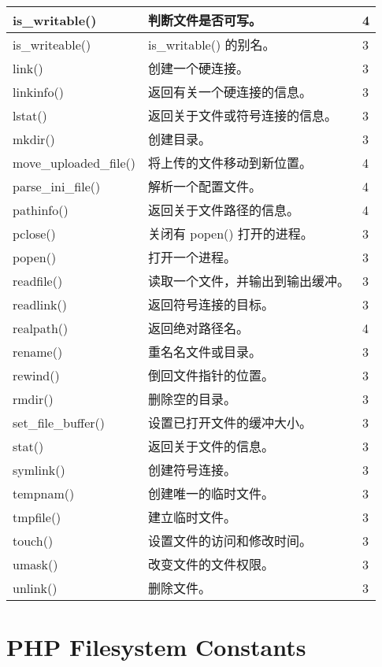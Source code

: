 \begin{longtable}{|m{120pt}|m{250pt}|m{20pt}|}
\hline
is\_writable()	&判断文件是否可写。	&4\\
\hline
is\_writeable()	&is\_writable() 的别名。	&3\\
\hline
link()	&创建一个硬连接。	&3\\
\hline
linkinfo()	&返回有关一个硬连接的信息。	&3\\
\hline
lstat()	&返回关于文件或符号连接的信息。	&3\\
\hline
mkdir()	&创建目录。	&3\\
\hline
move\_uploaded\_file()	&将上传的文件移动到新位置。	&4\\
\hline
parse\_ini\_file()	&解析一个配置文件。	&4\\
\hline
pathinfo()	&返回关于文件路径的信息。	&4\\
\hline
pclose()	&关闭有 popen() 打开的进程。	&3\\
\hline
popen()	&打开一个进程。	&3\\
\hline
readfile()	&读取一个文件，并输出到输出缓冲。	&3\\
\hline
readlink()	&返回符号连接的目标。	&3\\
\hline
realpath()	&返回绝对路径名。	&4\\
\hline
rename()	&重名名文件或目录。	&3\\
\hline
rewind()	&倒回文件指针的位置。	&3\\
\hline
rmdir()	&删除空的目录。	&3\\
\hline
set\_file\_buffer()	&设置已打开文件的缓冲大小。	&3\\
\hline
stat()	&返回关于文件的信息。	&3\\
\hline
symlink()	&创建符号连接。	&3\\
\hline
tempnam()	&创建唯一的临时文件。&	3\\
\hline
tmpfile()	&建立临时文件。	&3\\
\hline
touch()	&设置文件的访问和修改时间。	&3\\
\hline
umask()	&改变文件的文件权限。	&3\\
\hline
unlink()	&删除文件。	&3\\
\hline
\end{longtable}


\section{PHP Filesystem Constants}


